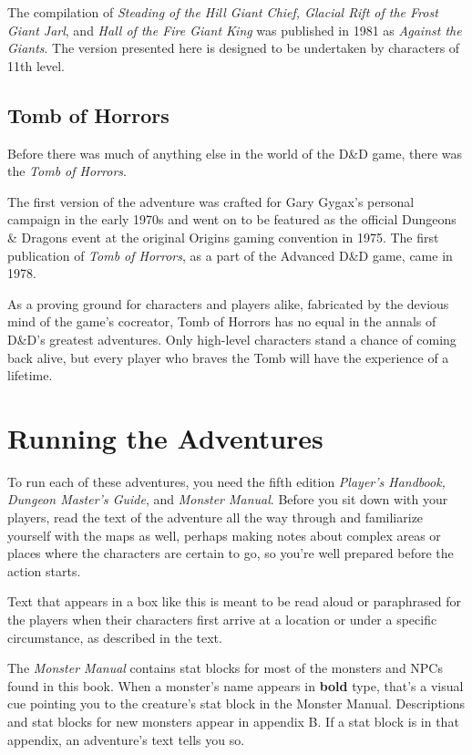 \documentclass[10pt,a4paper,twoside,bg=print,twocolumn,openany,nodeprecatedcode]{dndbook}
\begin{document}
The compilation of \textit{Steading of the Hill Giant Chief, Glacial Rift of the Frost Giant Jarl}, and \textit{Hall of the Fire Giant King} was published in 1981 as \textit{Against the Giants}. The version presented here is designed to be undertaken by characters of 11th level.

\subsection{Tomb of Horrors}
Before there was much of anything else in the world of the D\&D game, there was the \textit{Tomb of Horrors}.

The first version of the adventure was crafted for Gary Gygax's personal campaign in the early 1970s and went on to be featured as the official Dungeons \& Dragons event at the original Origins gaming convention in 1975. The first publication of \textit{Tomb of Horrors}, as a part of the Advanced D\&D game, came in 1978.

As a proving ground for characters and players alike, fabricated by the devious mind of the game's cocreator, Tomb of Horrors has no equal in the annals of D\&D's greatest adventures. Only high-level characters stand a chance of coming back alive, but every player who braves the Tomb will have the experience of a lifetime.

\section{Running the Adventures}
To run each of these adventures, you need the fifth edition \textit{Player's Handbook, Dungeon Master's Guide}, and \textit{Monster Manual}. Before you sit down with your players, read the text of the adventure all the way through and familiarize yourself with the maps as well, perhaps making notes about complex areas or places where the characters are certain to go, so you're well prepared before the action starts.

\begin{DndSidebar}[float=!b]{}
Text that appears in a box like this is meant to be read aloud or paraphrased for the players when their characters first arrive at a location or under a specific circumstance, as described in the text.



\end{DndSidebar}

The \textit{Monster Manual} contains stat blocks for most of the monsters and NPCs found in this book. When a monster's name appears in \textbf{bold} type, that's a visual cue pointing you to the creature's stat block in the Monster Manual. Descriptions and stat blocks for new monsters appear in appendix B. If a stat block is in that appendix, an adventure's text tells you so.
\end{document}
